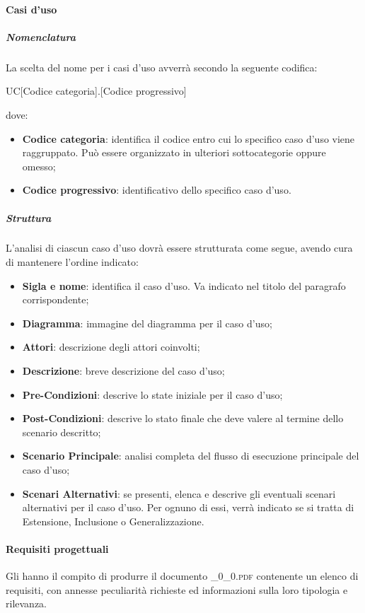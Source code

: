		\paragraph{Casi d'uso}
		
			\subparagraph{Nomenclatura}
			La scelta del nome per i casi d'uso avverrà secondo la seguente codifica:
			\begin{center}
				UC[Codice categoria].[Codice progressivo]
			\end{center}
			dove:
			\begin{itemize}
				\item\textbf{Codice categoria}: identifica il codice entro cui lo specifico caso d'uso viene raggruppato. Può essere organizzato in ulteriori sottocategorie oppure omesso;
				\item\textbf{Codice progressivo}: identificativo dello specifico caso d'uso.
			\end{itemize}
			
			\subparagraph{Struttura}
			L'analisi di ciascun caso d'uso dovrà essere strutturata come segue, avendo cura di mantenere l'ordine indicato:
			\begin{itemize}
				\item\textbf{Sigla e nome}: identifica il caso d'uso. Va indicato nel titolo del paragrafo corrispondente;
				\item\textbf{Diagramma}: immagine del diagramma per il caso d'uso;
				\item\textbf{Attori}: descrizione degli attori coinvolti;
				\item\textbf{Descrizione}: breve descrizione del caso d'uso;
				\item\textbf{Pre-Condizioni}: descrive lo state iniziale per il caso d'uso;
				\item\textbf{Post-Condizioni}: descrive lo stato finale che deve valere al termine dello scenario descritto;
				\item\textbf{Scenario Principale}: analisi completa del flusso di esecuzione principale del caso d'uso;
				\item\textbf{Scenari Alternativi}: se presenti, elenca e descrive gli eventuali scenari alternativi per il caso d'uso. Per ognuno di essi, verrà indicato se si tratta di Estensione, Inclusione o Generalizzazione.
			\end{itemize}
		
		\paragraph{Requisiti progettuali}
		Gli \textit{\Anas} hanno il compito di produrre il documento \textsc{\_0\_0.pdf} contenente un elenco di requisiti, con annesse peculiarità richieste ed informazioni sulla loro tipologia e rilevanza.
		
